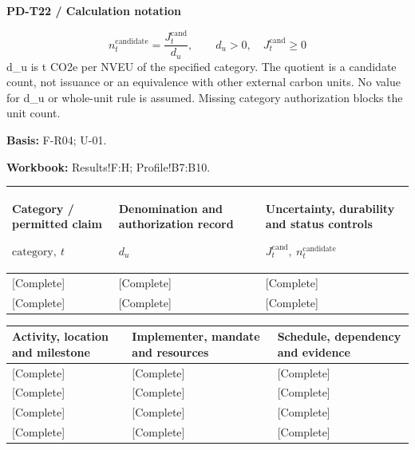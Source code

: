 \par\begingroup\sffamily\fontsize{8}{10}\selectfont\color{NEBGreen}\setlength{\parskip}{2pt}\setlength{\abovedisplayskip}{4pt}\setlength{\belowdisplayskip}{4pt}\setlength{\abovedisplayshortskip}{2pt}\setlength{\belowdisplayshortskip}{3pt}
\textbf{PD-T22 / Calculation notation}\par
{\fontsize{9}{11}\selectfont\[ n_t^{\mathrm{candidate}}=\frac{J_t^{\mathrm{cand}}}{d_u},\qquad d_u>0,\quad J_t^{\mathrm{cand}}\ge0 \]}
d\_u is t CO2e per NVEU of the specified category. The quotient is a candidate count, not issuance or an equivalence with other external carbon units. No value for d\_u or whole-unit rule is assumed. Missing category authorization blocks the unit count.\par
\textbf{Basis:} F-R04; U-01.\par
\textbf{Workbook:} Results!F:H; Profile!B7:B10.\par\endgroup
{\sffamily\fontsize{8.3}{10.3}\selectfont\begin{longtable}{@{}P{51.14mm} P{56.09mm} P{57.74mm}@{}}
\toprule
\textbf{Category / permitted claim}\par {\normalfont\fontsize{8.2}{10}\selectfont $\text{category},\ t$} & \textbf{Denomination and authorization record}\par {\normalfont\fontsize{8.2}{10}\selectfont $d_u$} & \textbf{Uncertainty, durability and status controls}\par {\normalfont\fontsize{8.2}{10}\selectfont $J_t^{\mathrm{cand}},\ n_t^{\mathrm{candidate}}$}\\\midrule\endhead
\rule{0pt}{7.7mm}[Complete] & [Complete] & [Complete]\\\hline
\rule{0pt}{7.7mm}[Complete] & [Complete] & [Complete]\\\hline
\end{longtable}}
{\sffamily\fontsize{8.3}{10.3}\selectfont\begin{longtable}{@{}P{56.09mm} P{56.09mm} P{52.79mm}@{}}
\toprule
\textbf{Activity, location and milestone} & \textbf{Implementer, mandate and resources} & \textbf{Schedule, dependency and evidence}\\\midrule\endhead
\rule{0pt}{7.7mm}[Complete] & [Complete] & [Complete]\\\hline
\rule{0pt}{7.7mm}[Complete] & [Complete] & [Complete]\\\hline
\rule{0pt}{7.7mm}[Complete] & [Complete] & [Complete]\\\hline
\rule{0pt}{7.7mm}[Complete] & [Complete] & [Complete]\\\hline
\end{longtable}}
